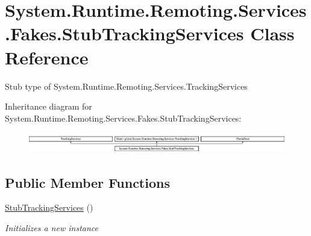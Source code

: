 \hypertarget{class_system_1_1_runtime_1_1_remoting_1_1_services_1_1_fakes_1_1_stub_tracking_services}{\section{System.\-Runtime.\-Remoting.\-Services.\-Fakes.\-Stub\-Tracking\-Services Class Reference}
\label{class_system_1_1_runtime_1_1_remoting_1_1_services_1_1_fakes_1_1_stub_tracking_services}
}


Stub type of System.\-Runtime.\-Remoting.\-Services.\-Tracking\-Services 


Inheritance diagram for System.\-Runtime.\-Remoting.\-Services.\-Fakes.\-Stub\-Tracking\-Services\-:\begin{figure}[H]
\begin{center}
\leavevmode
\includegraphics[height=0.910569cm]{class_system_1_1_runtime_1_1_remoting_1_1_services_1_1_fakes_1_1_stub_tracking_services}
\end{center}
\end{figure}
\subsection*{Public Member Functions}
\begin{DoxyCompactItemize}
\item 
\hyperlink{class_system_1_1_runtime_1_1_remoting_1_1_services_1_1_fakes_1_1_stub_tracking_services_a0a6f3b063f2efea73477b120de6098ce}{Stub\-Tracking\-Services} ()
\begin{DoxyCompactList}\small\item\em Initializes a new instance\end{DoxyCompactList}\end{DoxyCompactItemize}
